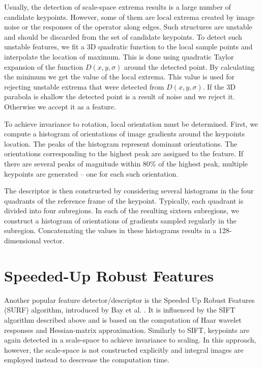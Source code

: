 Usually, the detection of scale-space extrema results is a large number of candidate keypoints. 
However, some of them are local extrema created by image noise or the responses of the operator along edges. 
Such structures are unstable and should be discarded from the set of candidate keypoints.
To detect such unstable features, we fit a 3D quadratic function to the local sample points and interpolate the location of maximum.
This is done using quadratic Taylor expansion of the function $D(x, y, \sigma)$ around the detected point.
By calculating the minimum we get the value of the local extrema.
This value is used for rejecting unstable extrema that were detected from $D(x, y, \sigma)$.
If the 3D parabola is shallow the detected point is a result of noise and we reject it.
Otherwise we accept it as a feature.

To achieve invariance to rotation, local orientation must be determined. 
First, we compute a histogram of orientations of image gradients around the keypoints location. 
The peaks of the histogram represent dominant orientations. 
The orientations corresponding to the highest peak are assigned to the feature. 
If there are several peaks of magnitude within 80\% of the highest peak, multiple keypoints are generated – one for each such orientation.

The descriptor is then constructed by considering several histograms in the four quadrants of the reference frame of the keypoint.
Typically, each quadrant is divided into four subregions. 
In each of the resulting sixteen subregions, we construct a histogram of orientations of gradients sampled regularly in the subregion. 
Concatenating the values in these histograms results in a 128-dimensional vector.



\section{Speeded-Up Robust Features}

Another popular feature detector/descriptor is the Speeded Up Robust Features (SURF) algorithm, introduced by Bay et al. \cite{surf2006}. 
It is influenced by the SIFT algorithm described above and is based on the computation of Haar wavelet responses and Hessian-matrix approximation. 
Similarly to SIFT, keypoints are again detected in a scale-space to achieve invariance to scaling. 
In this approach, however, the scale-space is not constructed explicitly and integral images are employed instead to descrease the computation time. %

